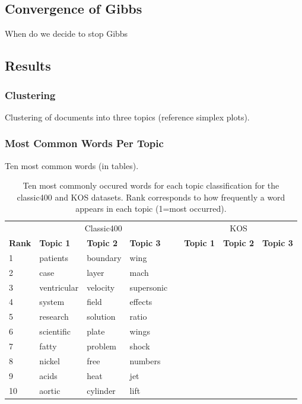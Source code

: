 \documentclass[10pt]{article}
\newcommand{\ra}[1]{\renewcommand{\arraystretch}{#1}}
\begin{document}
%
%
\subsection{Convergence of Gibbs}
When do we decide to stop Gibbs


%
%
\subsection{Results}

\subsubsection{Clustering}
Clustering of documents into three topics (reference simplex plots).

\subsubsection{Most Common Words Per Topic}
Ten most common words (in tables).

\begin{table}
	\centering
    \ra{1.2}
	\begin{tabular}{@{} l l l l c l l l @{}}
        \toprule
        & \multicolumn{3}{c}{Classic400} & \phantom{abc} & \multicolumn{3}{c}{KOS}\\
        \cmidrule{2-4} \cmidrule{6-8}
        \bf{Rank} & \bf{Topic 1} & \bf{Topic 2} & \bf{Topic 3} && \bf{Topic 1} & \bf{Topic 2} & \bf{Topic 3} \\
        \midrule
         1 & patients     & boundary     & wing         && & & \\
         2 & case         & layer        & mach         && & & \\
         3 & ventricular  & velocity     & supersonic   && & & \\
         4 & system       & field        & effects      && & & \\
         5 & research     & solution     & ratio        && & & \\
         6 & scientific   & plate        & wings        && & & \\
         7 & fatty        & problem      & shock        && & & \\
         8 & nickel       & free         & numbers      && & & \\
         9 & acids        & heat         & jet          && & & \\
        10 & aortic       & cylinder     & lift         && & & \\
        \bottomrule
	\end{tabular}
	\caption{Ten most commonly occured words for each topic classification for the classic400 and KOS datasets. Rank corresponds to how frequently a word appears in each topic (1=most occurred).}
	\label{tab:common_classic400}
\end{table}
\end{document}
